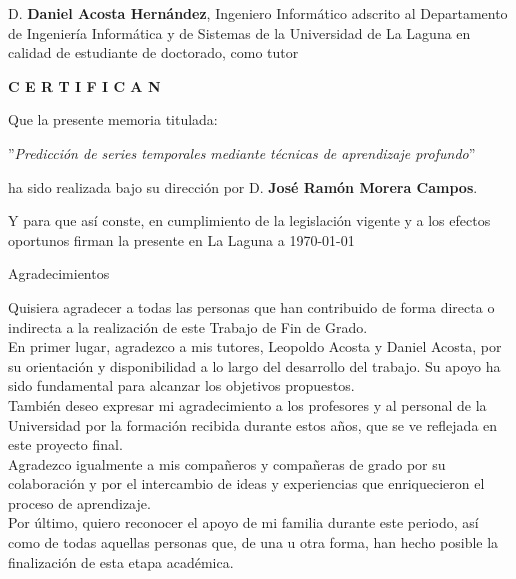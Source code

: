 \documentclass[spanish,a4paper,12pt,oneside]{extreport}
\begin{document}
\bigskip
D. {\bf Daniel Acosta Hernández}, Ingeniero Informático adscrito al Departamento de Ingeniería Informática y de Sistemas de la Universidad de La Laguna en calidad de estudiante de doctorado, como tutor

\pagestyle{empty}

\bigskip
\bigskip
{\bf C E R T I F I C A N}

\bigskip
\bigskip
Que la presente memoria titulada:

\bigskip
''{\it Predicción de series temporales mediante técnicas de aprendizaje profundo}''

\bigskip
\bigskip
\bigskip

\noindent ha sido realizada bajo su dirección por D. {\bf José Ramón Morera Campos}.

\bigskip
\bigskip

Y para que así conste, en cumplimiento de la legislación vigente y a los efectos
oportunos firman la presente en La Laguna a \today

\newpage
\thispagestyle{empty}

{ \begin{LARGE}
Agradecimientos
\end{LARGE}

\hspace{3mm}

\begin{large}
Quisiera agradecer a todas las personas que han contribuido de forma directa o indirecta a la realización de este Trabajo de Fin de Grado. \\

En primer lugar, agradezco a mis tutores, Leopoldo Acosta y Daniel Acosta, por su orientación y disponibilidad a lo largo del desarrollo del trabajo. 
Su apoyo ha sido fundamental para alcanzar los objetivos propuestos. \\

También deseo expresar mi agradecimiento a los profesores y al personal de la Universidad por la formación recibida durante estos años, que se ve reflejada en este proyecto final. \\

Agradezco igualmente a mis compañeros y compañeras de grado por su colaboración y por el intercambio de ideas y experiencias que enriquecieron el proceso de aprendizaje. \\

Por último, quiero reconocer el apoyo de mi familia durante este periodo, así como de todas aquellas personas que, de una u otra forma, han hecho posible la finalización de esta etapa académica. \\
\end{large}

}
\newpage
\thispagestyle{empty}
\end{document}
